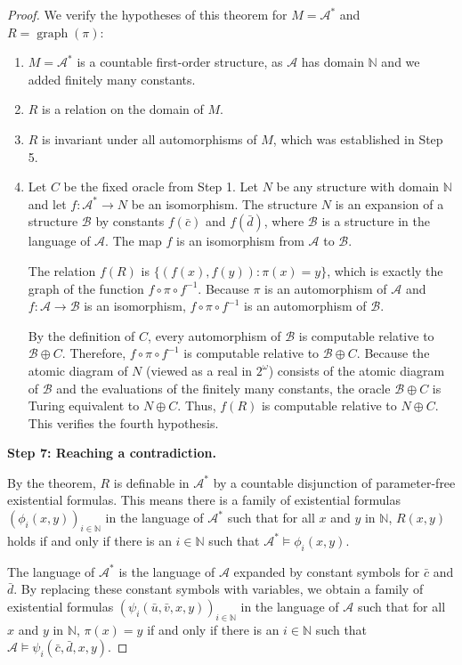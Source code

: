 \begin{proof}
We verify the hypotheses of this theorem for $M = \mathcal{A}^*$ and $R = \operatorname{graph}(\pi)$:
\begin{enumerate}
\item $M = \mathcal{A}^*$ is a countable first-order structure, as $\mathcal{A}$ has domain $\mathbb{N}$ and we added finitely many constants.
\item $R$ is a relation on the domain of $M$.
\item $R$ is invariant under all automorphisms of $M$, which was established in Step 5.
\item Let $C$ be the fixed oracle from Step 1. Let $N$ be any structure with domain $\mathbb{N}$ and let $f: \mathcal{A}^* \to N$ be an isomorphism. The structure $N$ is an expansion of a structure $\mathcal{B}$ by constants $f(\bar{c})$ and $f(\bar{d})$, where $\mathcal{B}$ is a structure in the language of $\mathcal{A}$. The map $f$ is an isomorphism from $\mathcal{A}$ to $\mathcal{B}$. 

The relation $f(R)$ is $\{ (f(x), f(y)) : \pi(x) = y \}$, which is exactly the graph of the function $f \circ \pi \circ f^{-1}$. Because $\pi$ is an automorphism of $\mathcal{A}$ and $f: \mathcal{A} \to \mathcal{B}$ is an isomorphism, $f \circ \pi \circ f^{-1}$ is an automorphism of $\mathcal{B}$. 

By the definition of $C$, every automorphism of $\mathcal{B}$ is computable relative to $\mathcal{B} \oplus C$. Therefore, $f \circ \pi \circ f^{-1}$ is computable relative to $\mathcal{B} \oplus C$. Because the atomic diagram of $N$ (viewed as a real in $2^\omega$) consists of the atomic diagram of $\mathcal{B}$ and the evaluations of the finitely many constants, the oracle $\mathcal{B} \oplus C$ is Turing equivalent to $N \oplus C$. Thus, $f(R)$ is computable relative to $N \oplus C$. This verifies the fourth hypothesis.
\end{enumerate}

\textbf{Step 7: Reaching a contradiction.}

By the theorem, $R$ is definable in $\mathcal{A}^*$ by a countable disjunction of parameter-free existential formulas. This means there is a family of existential formulas $(\phi_i(x,y))_{i \in \mathbb{N}}$ in the language of $\mathcal{A}^*$ such that for all $x$ and $y$ in $\mathbb{N}$, $R(x, y)$ holds if and only if there is an $i \in \mathbb{N}$ such that $\mathcal{A}^* \models \phi_i(x, y)$.

The language of $\mathcal{A}^*$ is the language of $\mathcal{A}$ expanded by constant symbols for $\bar{c}$ and $\bar{d}$. By replacing these constant symbols with variables, we obtain a family of existential formulas $(\psi_i(\bar{u}, \bar{v}, x, y))_{i \in \mathbb{N}}$ in the language of $\mathcal{A}$ such that for all $x$ and $y$ in $\mathbb{N}$, $\pi(x) = y$ if and only if there is an $i \in \mathbb{N}$ such that $\mathcal{A} \models \psi_i(\bar{c}, \bar{d}, x, y)$.


\end{proof}
